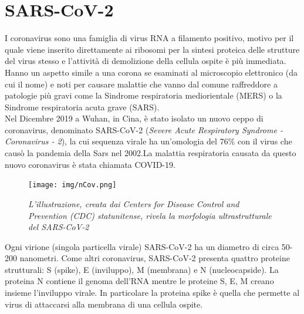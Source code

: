\documentclass[a4paper,10pt]{article}
\begin{document}
\tableofcontents

\newpage

\section{SARS-CoV-2}
I coronavirus sono una famiglia di virus RNA a filamento positivo, motivo per il quale viene inserito direttamente ai ribosomi per la sintesi proteica delle strutture del virus stesso e l'attività di demolizione della cellula ospite è più immediata. Hanno un aspetto simile a una corona se esaminati al microscopio elettronico (da cui il nome) e noti per causare malattie che vanno dal comune raffreddore a patologie più gravi come la Sindrome respiratoria mediorientale (MERS) o la Sindrome respiratoria acuta grave (SARS). \\
Nel Dicembre 2019 a Wuhan, in Cina, è stato isolato un nuovo ceppo di coronavirus, denominato SARS-CoV-2 (\textit{Severe Acute Respiratory Syndrome - Coronavirus - 2}), la cui sequenza virale ha un'omologia del 76\% con il virus che causò la pandemia della Sars nel 2002.La malattia respiratoria causata da questo nuovo coronavirus è stata chiamata COVID-19.

\begin{figure}[H]
\centering
\texttt{[image: img/nCov.png]}
\caption{\textit{L’illustrazione, creata dai Centers for Disease Control and Prevention (CDC) statunitense, rivela la morfologia ultrastrutturale del SARS-CoV-2}}
\label{fig:1}
\end{figure}

Ogni virione (singola particella virale) SARS-CoV-2 ha un diametro di circa 50-200 nanometri. Come altri coronavirus, SARS-CoV-2 presenta quattro proteine strutturali: S (spike), E (inviluppo), M (membrana) e N (nucleocapside). La proteina N contiene il genoma dell'RNA mentre le proteine S, E, M creano insieme l'inviluppo virale. %
In particolare la proteina spike è quella che permette al virus di attaccarsi alla membrana di una cellula ospite.\\
\end{document}
